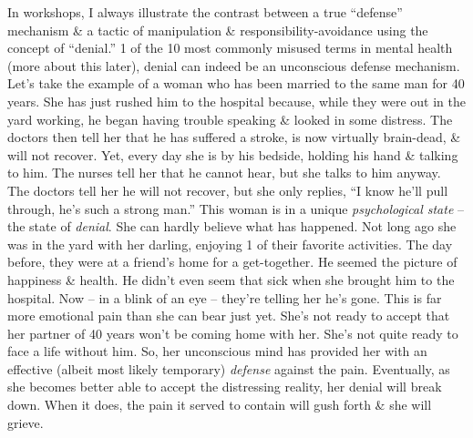 \documentclass{article}
\numberwithin{equation}{section}
\begin{document}
In workshops, I always illustrate the contrast between a true ``defense'' mechanism \& a tactic of manipulation \& responsibility-avoidance using the concept of ``denial.'' 1 of the 10 most commonly misused terms in mental health (more about this later), denial can indeed be an unconscious defense mechanism. Let's take the example of a woman who has been married to the same man for 40 years. She has just rushed him to the hospital because, while they were out in the yard working, he began having trouble speaking \& looked in some distress. The doctors then tell her that he has suffered a stroke, is now virtually brain-dead, \& will not recover. Yet, every day she is by his bedside, holding his hand \& talking to him. The nurses tell her that he cannot hear, but she talks to him anyway. The doctors tell her he will not recover, but she only replies, ``I know he'll pull through, he's such a strong man.'' This woman is in a unique \textit{psychological state} -- the state of \textit{denial}. She can hardly believe what has happened. Not long ago she was in the yard with her darling, enjoying 1 of their favorite activities. The day before, they were at a friend's home for a get-together. He seemed the picture of happiness \& health. He didn't even seem that sick when she brought him to the hospital. Now -- in a blink of an eye -- they're telling her he's gone. This is far more emotional pain than she can bear just yet. She's not ready to accept that her partner of 40 years won't be coming home with her. She's not quite ready to face a life without him. So, her unconscious mind has provided her with an effective (albeit most likely temporary) \textit{defense} against the pain. Eventually, as she becomes better able to accept the distressing reality, her denial will break down. When it does, the pain it served to contain will gush forth \& she will grieve.
\end{document}
